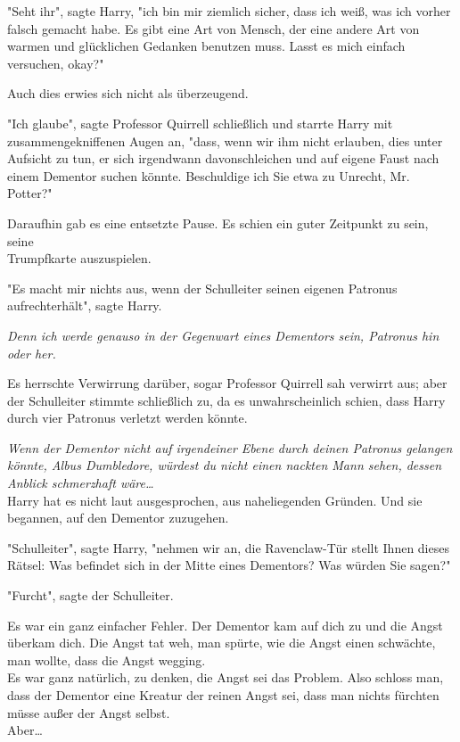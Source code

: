 {"Seht ihr", sagte Harry, "ich bin mir ziemlich sicher, dass ich weiß, was ich vorher falsch gemacht habe. Es gibt eine Art von Mensch, der eine andere Art von warmen und glücklichen Gedanken benutzen muss. Lasst es mich einfach versuchen, okay?"

Auch dies erwies sich nicht als überzeugend.

"Ich glaube", sagte Professor Quirrell schließlich und starrte Harry mit zusammengekniffenen Augen an, "dass, wenn wir ihm nicht erlauben, dies unter Aufsicht zu tun, er sich irgendwann davonschleichen und auf eigene Faust nach einem Dementor suchen könnte. Beschuldige ich Sie etwa zu Unrecht, Mr. Potter?"

Daraufhin gab es eine entsetzte Pause. Es schien ein guter Zeitpunkt zu sein, seine\\ Trumpfkarte auszuspielen.

"Es macht mir nichts aus, wenn der Schulleiter seinen eigenen Patronus aufrechterhält", sagte Harry.

\emph{Denn ich werde genauso in der Gegenwart eines Dementors sein, Patronus hin oder her.}

Es herrschte Verwirrung darüber, sogar Professor Quirrell sah verwirrt aus; aber der Schulleiter stimmte schließlich zu, da es unwahrscheinlich schien, dass Harry durch vier Patronus verletzt werden könnte.

\emph{Wenn der Dementor nicht auf irgendeiner Ebene durch deinen Patronus gelangen könnte, Albus Dumbledore, würdest du nicht einen nackten Mann sehen, dessen Anblick schmerzhaft wäre…}\\ Harry hat es nicht laut ausgesprochen, aus naheliegenden Gründen. Und sie begannen, auf den Dementor zuzugehen.

"Schulleiter", sagte Harry, "nehmen wir an, die Ravenclaw-Tür stellt Ihnen dieses Rätsel: Was befindet sich in der Mitte eines Dementors? Was würden Sie sagen?"

"Furcht", sagte der Schulleiter.

Es war ein ganz einfacher Fehler. Der Dementor kam auf dich zu und die Angst überkam dich. Die Angst tat weh, man spürte, wie die Angst einen schwächte, man wollte, dass die Angst wegging.\\ Es war ganz natürlich, zu denken, die Angst sei das Problem. Also schloss man, dass der Dementor eine Kreatur der reinen Angst sei, dass man nichts fürchten müsse außer der Angst selbst.\\ Aber…

}
